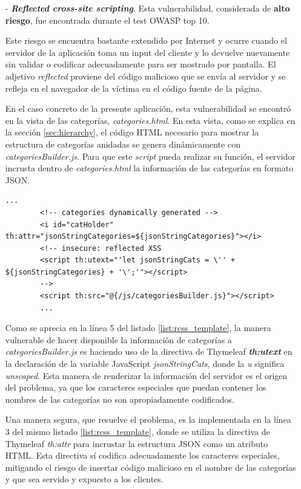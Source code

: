 \documentclass[a4paper]{article}
\begin{document}
	\begin{itemize}
		\item[-] \textbf{\emph{Reflected cross-site scripting}}. Esta vulnerabilidad, considerada de \textbf{alto riesgo}, fue encontrada durante el test OWASP top 10.
		
		Este riesgo se encuentra bastante extendido por Internet y ocurre cuando el servidor de la aplicación toma un input del cliente y lo devuelve nuevamente sin validar o codificar adecuadamente para ser mostrado por pantalla. El adjetivo \emph{reflected} proviene del código malicioso que se envía al servidor y se refleja en el navegador de la víctima en el código fuente de la página.
		
		En el caso concreto de la presente aplicación, esta vulnerabilidad se encontró en la vista de las categorías, \emph{categories.html}. En esta vista, como se explica en la sección \ref{sec:hierarchy}, el código HTML necesario para mostrar la estructura de categorías anidadas se genera dinámicamente con \emph{categoriesBuilder.js}. Para que este \emph{script} pueda realizar su función, el servidor incrusta dentro de \emph{categories.html} la información de las categorías en formato JSON.
		\\
		
		\begin{lstlisting}[caption=Extracto de categories.html con la vulnerabilidad encontrada,label=list:rcss_template]
		...
		<!-- categories dynamically generated -->
		<i id="catHolder" th:attr="jsonStringCategories=${jsonStringCategories}"></i>
		<!-- insecure: reflected XSS
		<script th:utext="'let jsonStringCats = \'' + ${jsonStringCategories} + '\';'"></script>
		-->
		<script th:src="@{/js/categoriesBuilder.js}"></script>
		...
		\end{lstlisting}
		
		Como se aprecia en la línea 5 del listado \ref{list:rcss_template}, la manera vulnerable de hacer disponible la información de categorías a \emph{categoriesBuilder.js} es haciendo uso de la directiva de Thymeleaf \textbf{\emph{th:utext}} en la declaración de la variable JavaScript \emph{jsonStringCats}, donde la \emph{u} significa \emph{unscaped}. Esta manera de renderizar la información del servidor es el origen del problema, ya que los caracteres especiales que puedan contener los nombres de las categorías no son apropiadamente codificados.
		
		Una manera segura, que resuelve el problema, es la implementada en la línea 3 del mismo listado \ref{list:rcss_template}, donde se utiliza la directiva de Thymeleaf \emph{th:attr} para incrustar la estructura JSON como un atributo HTML. Esta directiva sí codifica adecuadamente los caracteres especiales, mitigando el riesgo de insertar código malicioso en el nombre de las categorías y que sea servido y expuesto a los clientes.
		

\end{itemize}
\end{document}
